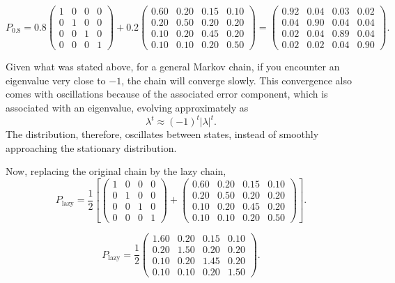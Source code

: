 \[
P_{0.8}
=
0.8
\begin{pmatrix}
1 & 0 & 0 & 0 \\
0 & 1 & 0 & 0 \\
0 & 0 & 1 & 0 \\
0 & 0 & 0 & 1
\end{pmatrix}
+
0.2
\begin{pmatrix}
0.60 & 0.20 & 0.15 & 0.10 \\
0.20 & 0.50 & 0.20 & 0.20 \\
0.10 & 0.20 & 0.45 & 0.20 \\
0.10 & 0.10 & 0.20 & 0.50
\end{pmatrix}
=
\begin{pmatrix}
0.92 & 0.04 & 0.03 & 0.02 \\
0.04 & 0.90 & 0.04 & 0.04 \\
0.02 & 0.04 & 0.89 & 0.04 \\
0.02 & 0.02 & 0.04 & 0.90
\end{pmatrix}.
\]

Given what was stated above, for a general Markov chain, if you encounter an eigenvalue very close to \(-1\), the chain will converge slowly. This convergence also comes with oscillations because of the associated error component, which is associated with an eigenvalue, evolving approximately as
\[
\lambda^t \approx (-1)^t |\lambda|^t.
\]
The distribution, therefore, oscillates between states, instead of smoothly approaching the stationary distribution.

Now, replacing the original chain by the lazy chain,
\[
P_{\mathrm{lazy}}
=
\frac{1}{2}
\left[
\begin{pmatrix}
1 & 0 & 0 & 0 \\
0 & 1 & 0 & 0 \\
0 & 0 & 1 & 0 \\
0 & 0 & 0 & 1
\end{pmatrix}
+
\begin{pmatrix}
0.60 & 0.20 & 0.15 & 0.10 \\
0.20 & 0.50 & 0.20 & 0.20 \\
0.10 & 0.20 & 0.45 & 0.20 \\
0.10 & 0.10 & 0.20 & 0.50
\end{pmatrix}
\right].
\]

\[
P_{\mathrm{lazy}}
=
\frac{1}{2}
\begin{pmatrix}
1.60 & 0.20 & 0.15 & 0.10 \\
0.20 & 1.50 & 0.20 & 0.20 \\
0.10 & 0.20 & 1.45 & 0.20 \\
0.10 & 0.10 & 0.20 & 1.50
\end{pmatrix}.
\]

